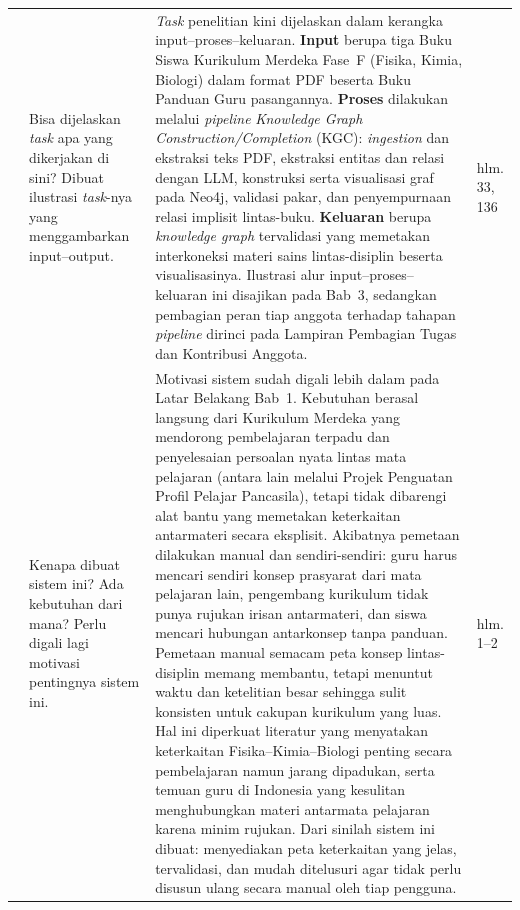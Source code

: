 \documentclass[12pt, a4paper]{article}
\begin{document}
\begin{longtable}{|
  >{\centering\arraybackslash}p{\revisionNoCol}|
  p{\revisionNoteCol}|
  p{\revisionResultCol}|
  >{\centering\arraybackslash}p{\revisionPageCol}|}
\multicolumn{4}{|p{\revisionFooterCol}|}{\textbf{Penguji 1 — Evi Yulianti, M.Comp.Sc., M.Kom., Ph.D.}} \\
\hline
1 & Bisa dijelaskan \textit{task} apa yang dikerjakan di sini? Dibuat ilustrasi
\textit{task}-nya yang menggambarkan input--output. &
\textit{Task} penelitian kini dijelaskan dalam kerangka input--proses--keluaran.
\textbf{Input} berupa tiga Buku Siswa Kurikulum Merdeka Fase~F (Fisika, Kimia,
Biologi) dalam format PDF beserta Buku Panduan Guru pasangannya.
\textbf{Proses} dilakukan melalui \textit{pipeline} \textit{Knowledge Graph
Construction/Completion} (KGC): \textit{ingestion} dan ekstraksi teks PDF,
ekstraksi entitas dan relasi dengan LLM, konstruksi serta visualisasi graf pada
Neo4j, validasi pakar, dan penyempurnaan relasi implisit lintas-buku.
\textbf{Keluaran} berupa \textit{knowledge graph} tervalidasi yang memetakan
interkoneksi materi sains lintas-disiplin beserta visualisasinya. Ilustrasi alur
input--proses--keluaran ini disajikan pada Bab~3, sedangkan pembagian peran tiap
anggota terhadap tahapan \textit{pipeline} dirinci pada Lampiran Pembagian Tugas
dan Kontribusi Anggota. &
hlm. 33, 136 \\
\hline
2 & Kenapa dibuat sistem ini? Ada kebutuhan dari mana? Perlu digali lagi
motivasi pentingnya sistem ini. &
Motivasi sistem sudah digali lebih dalam pada Latar Belakang Bab~1. Kebutuhan
berasal langsung dari Kurikulum Merdeka yang mendorong pembelajaran terpadu dan
penyelesaian persoalan nyata lintas mata pelajaran (antara lain melalui Projek
Penguatan Profil Pelajar Pancasila), tetapi tidak dibarengi alat bantu yang
memetakan keterkaitan antarmateri secara eksplisit. Akibatnya pemetaan dilakukan
manual dan sendiri-sendiri: guru harus mencari sendiri konsep prasyarat dari
mata pelajaran lain, pengembang kurikulum tidak punya rujukan irisan antarmateri,
dan siswa mencari hubungan antarkonsep tanpa panduan. Pemetaan manual semacam
peta konsep lintas-disiplin memang membantu, tetapi menuntut waktu dan ketelitian
besar sehingga sulit konsisten untuk cakupan kurikulum yang luas. Hal ini
diperkuat literatur yang menyatakan keterkaitan Fisika--Kimia--Biologi penting
secara pembelajaran namun jarang dipadukan, serta temuan guru di Indonesia yang
kesulitan menghubungkan materi antarmata pelajaran karena minim rujukan. Dari
sinilah sistem ini dibuat: menyediakan peta keterkaitan yang jelas, tervalidasi,
dan mudah ditelusuri agar tidak perlu disusun ulang secara manual oleh tiap
pengguna. &
hlm. 1--2 \\
\hline

\end{longtable}
\end{document}
